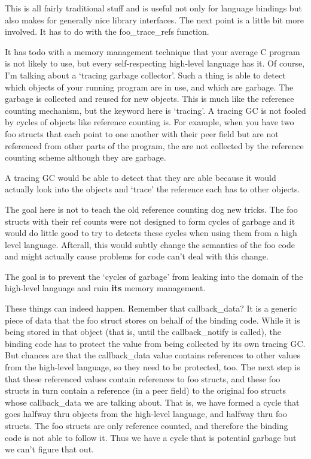 \documentclass{article}
\begin{document}
This is all fairly traditional stuff and is useful not only for
language bindings but also makes for generally nice library
interfaces.  The next point is a little bit more involved.  It has to
do with the foo\_trace\_refs function.

It has todo with a memory management technique that your average C
program is not likely to use, but every self-respecting high-level
language has it.  Of course, I'm talking about a `tracing garbage
collector'.  Such a thing is able to detect which objects of your
running program are in use, and which are garbage.  The garbage is
collected and reused for new objects.  This is much like the reference
counting mechanism, but the keyword here is `tracing'.  A tracing GC
is not fooled by cycles of objects like reference counting is.  For
example, when you have two foo structs that each point to one another
with their peer field but are not referenced from other parts of the
program, the are not collected by the reference counting scheme
although they are garbage.

A tracing GC would be able to detect that they are able because it
would actually look into the objects and `trace' the reference each
has to other objects.

The goal here is not to teach the old reference counting dog new
tricks.  The foo structs with their ref counts were not designed to
form cycles of garbage and it would do little good to try to detects
these cycles when using them from a high level language.  Afterall,
this would subtly change the semantics of the foo code and might
actually cause problems for code can't deal with this change.

The goal is to prevent the `cycles of garbage' from leaking into the
domain of the high-level language and ruin \textbf{its} memory
management.

These things can indeed happen.  Remember that callback\_data?  It is
a generic piece of data that the foo struct stores on behalf of the
binding code.  While it is being stored in that object (that is, until
the callback\_notify is called), the binding code has to protect the
value from being collected by its own tracing GC.  But chances are
that the callback\_data value contains references to other values from
the high-level language, so they need to be protected, too.  The next
step is that these referenced values contain references to foo
structs, and these foo structs in turn contain a reference (in a peer
field) to the original foo structs whose callback\_data we are talking
about.  That is, we have formed a cycle that goes halfway thru objects
from the high-level language, and halfway thru foo structs.  The foo
structs are only reference counted, and therefore the binding code is
not able to follow it.  Thus we have a cycle that is potential garbage
but we can't figure that out.
\end{document}
